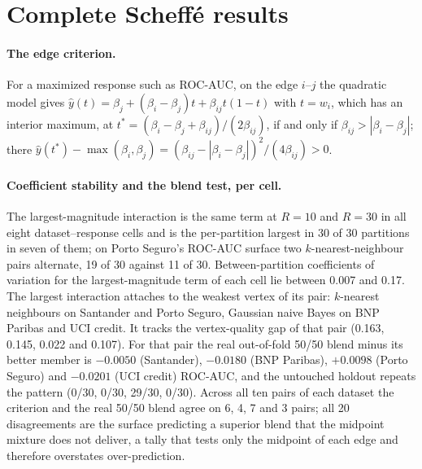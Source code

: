 \documentclass[11pt,a4paper]{article}
\begin{document}
\section{Complete Scheff\'e results}
\label{sec:s3}



\paragraph{The edge criterion.} For a maximized response such as ROC-AUC, on the edge $i$--$j$ the quadratic model
gives $\hat y(t) = \beta_j + (\beta_i - \beta_j)t + \beta_{ij}t(1-t)$ with $t = w_i$, which has an interior maximum,
at $t^* = (\beta_i - \beta_j + \beta_{ij})/(2\beta_{ij})$, if and only if $\beta_{ij} > |\beta_i - \beta_j|$; there
$\hat y(t^*) - \max(\beta_i, \beta_j) = (\beta_{ij} - |\beta_i - \beta_j|)^2/(4\beta_{ij}) > 0$.

\paragraph{Coefficient stability and the blend test, per cell.} The largest-magnitude interaction is the same term at
$R = 10$ and $R = 30$ in all eight dataset--response cells and is the per-partition largest in 30 of 30 partitions in
seven of them; on Porto Seguro's ROC-AUC surface two $k$-nearest-neighbour pairs alternate, 19 of 30 against 11 of 30.
Between-partition coefficients of variation for the largest-magnitude term of each cell lie between 0.007 and 0.17.
The largest interaction attaches to the weakest vertex of its pair: $k$-nearest neighbours on Santander and Porto
Seguro, Gaussian naive Bayes on BNP Paribas and UCI credit. It tracks the vertex-quality gap of that pair (0.163,
0.145, 0.022 and 0.107). For that pair the real out-of-fold 50/50 blend minus its better member is $-0.0050$
(Santander), $-0.0180$ (BNP Paribas), $+0.0098$ (Porto Seguro) and $-0.0201$ (UCI credit) ROC-AUC, and the untouched
holdout repeats the pattern (0/30, 0/30, 29/30, 0/30). Across all ten pairs of each dataset the criterion and the
real 50/50 blend agree on 6, 4, 7 and 3 pairs; all 20 disagreements are the surface predicting a superior blend that
the midpoint mixture does not deliver, a tally that tests only the midpoint of each edge and therefore overstates
over-prediction.
\end{document}
